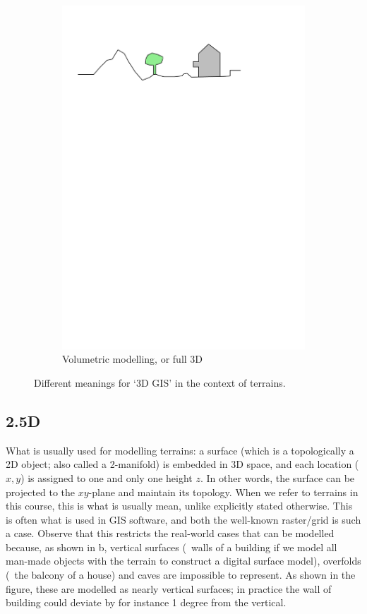 \begin{figure}
\begin{subfigure}[b]{0.45\linewidth}
    \includegraphics[page=4,width=\linewidth]{figs/dimgis}
    \caption{Volumetric modelling, or full 3D}\label{fig:dimgis:3}
  \end{subfigure}%
\caption{Different meanings for `3D GIS' in the context of terrains.}
\label{fig:dimgis}
\end{figure}

\subsection{2.5D} 
What is usually used for modelling terrains: a surface (which is a topologically a 2D object; also called a 2-manifold) is embedded in 3D space, and each location ($x,y$) is assigned to one and only one height $z$.
In other words, the surface can be projected to the $xy$-plane and maintain its topology.
When we refer to terrains in this course, this is what is usually mean, unlike explicitly stated otherwise.
This is often what is used in GIS software, and both the well-known raster/grid  is such a case.
Observe that this restricts the real-world cases that can be modelled because, as shown in b, vertical surfaces (\eg\ walls of a building if we model all man-made objects with the terrain to construct a digital surface model), overfolds (\eg\ the balcony of a house) and caves are impossible to represent.
As shown in the figure, these are modelled as nearly vertical surfaces; in practice the wall of building could deviate by for instance 1 degree from the vertical.



